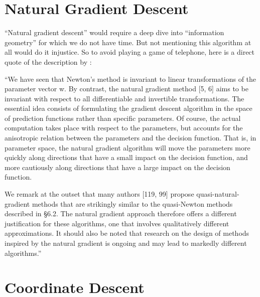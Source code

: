 \section{Natural Gradient Descent}

``Natural gradient descent'' would require a deep dive into ``information geometry''
for which we do not have time. But not mentioning this algorithm at all would do it
injustice. So to avoid playing a game of telephone, here is a direct quote of
the description by \textcite{bottouOptimizationMethodsLargeScale2018}:

``We have seen that Newton's method is invariant to linear transformations of
the parameter vector w. By contrast, the natural gradient method [5, 6] aims to
be invariant with respect to all differentiable and invertible transformations.
The essential idea consists of formulating the gradient descent algorithm in the
space of prediction functions rather than specific parameters. Of course, the
actual computation takes place with respect to the parameters, but accounts for
the anisotropic relation between the parameters and the decision function. That
is, in parameter space, the natural gradient algorithm will move the parameters
more quickly along directions that have a small impact on the decision function,
and more cautiously along directions that have a large impact on the decision
function.

We remark at the outset that many authors [119, 99] propose
quasi-natural-gradient methods that are strikingly similar to the quasi-Newton
methods described in §6.2. The natural gradient approach therefore offers a
different justification for these algorithms, one that involves qualitatively
different approximations. It should also be noted that research on the design of
methods inspired by the natural gradient is ongoing and may lead to markedly
different algorithms.''

\section{Coordinate Descent}\label{sec: coordinate descent}

